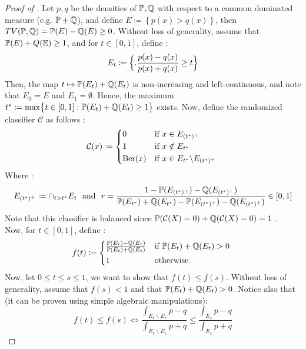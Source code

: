 \begin{proof}[Proof of ]
    Let $p,q$ be the densities of $\mathbb{P},\mathbb{Q}$ with respect to a common dominated measure (e.g. $\mathbb{P}+\mathbb{Q}$), and define $E \coloneqq \left\{p(x) > q(x)\right\}$, then $TV(\mathbb{P},\mathbb{Q}) = \mathbb{P}(E)-\mathbb{Q}(E) \geq 0$. Without loss of generality, assume that $\mathbb{P}(E)+Q(\mathbb{E}) \geq 1$, and for $t \in [0,1]$, define : \begin{equation*}
        E_t \coloneqq \Bigl\{.\frac{p(x)-q(x)}{p(x)+q(x)} \geq t \Bigr\}
    \end{equation*}
    Then, the map $t \mapsto \mathbb{P}(E_t)+\mathbb{Q}(E_t)$ is non-increasing and left-continuous, and note that $E_0 = E$ and $E_1 = \emptyset$.
    Hence, the maximum $t^* \coloneqq \max \bigl\{t \in [0,1] : \mathbb{P}(E_t) +\mathbb{Q}(E_t) \geq 1\bigr\}$ exists. Now, define the randomized classifier $\mathcal{C}$ as follows : 
    \begin{equation*}
        \mathcal{C}(x) \coloneqq \begin{cases*}
            0 \ &if $x \in E_{(t^*)^+}$ \\
            1  \ &if $x \notin E_{t^*}$ \\
            \text{Ber}(x) &if $x \in E_{t^*}\backslash E_{(t^*)^+}$
        \end{cases*}
    \end{equation*}
    Where : \begin{equation*}
        E_{(t^*)^+} \coloneqq \cap_{t>t^*}E_t \ \text{ and } \ r = \frac{1-\mathbb{P}(E_{(t^*)^+})-\mathbb{Q}(E_{(t^*)^+})}{\mathbb{P}(E_{t^*})+\mathbb{Q}(E_{t^*})-\mathbb{P}(E_{(t^*)^+})-\mathbb{Q}(E_{(t^*)^+})} \in [0,1]
    \end{equation*}
    Note that this classifier is balanced since 
        $\mathbb{P}(\mathcal{C}(X)=0)+ \mathbb{Q}(\mathcal{C}(X) = 0) = 1$ .\\
    Now, for $t \in [0,1]$, define : 
    \begin{equation*}
        f(t) \coloneqq \begin{cases*}
            \frac{\P(E_t)-\Q(E_t)}{\P(E_t)+\Q(E_t)} & if $\P(E_t) + \Q(E_t) >0$ \\ 
            1 & otherwise 
        \end{cases*}
    \end{equation*}
    Now, let $0\leq t \leq s \leq 1$, we want to show that $f(t) \leq f(s)$. Without loss of generality, assume that $f(s) < 1$ and that $\mathbb{P}(E_t) + \mathbb{Q}(E_t) >0$. Notice also that (it can be proven using simple algebraic manipulations): 
    \begin{equation*}
        f(t) \leq f(s) \Leftrightarrow \frac{\int_{E_t \backslash E_s} p-q}{\int_{E_t \backslash E_s} p+q} \leq \frac{\int_{E_s} p-q}{\int_{E_s} p+q}

\end{equation*}
\end{proof}
